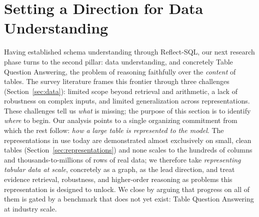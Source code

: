 \section{Setting a Direction for Data Understanding}
\label{sec:future-data}
Having established schema understanding through Reflect-SQL, our next research phase turns to the second pillar: data understanding, and concretely Table Question Answering, the problem of reasoning faithfully over the \emph{content} of tables. The survey literature frames this frontier through three challenges (Section~\ref{sec:data}): limited scope beyond retrieval and arithmetic, a lack of robustness on complex inputs, and limited generalization across representations. These challenges tell us \emph{what} is missing; the purpose of this section is to identify \emph{where} to begin. Our analysis points to a single organizing commitment from which the rest follow: \emph{how a large table is represented to the model}. The representations in use today are demonstrated almost exclusively on small, clean tables (Section~\ref{sec:representations}) and none scales to the hundreds of columns and thousands-to-millions of rows of real data; we therefore take \emph{representing tabular data at scale}, concretely as a graph, as the lead direction, and treat evidence retrieval, robustness, and higher-order reasoning as problems this representation is designed to unlock. We close by arguing that progress on all of them is gated by a benchmark that does not yet exist: Table Question Answering at industry scale.

